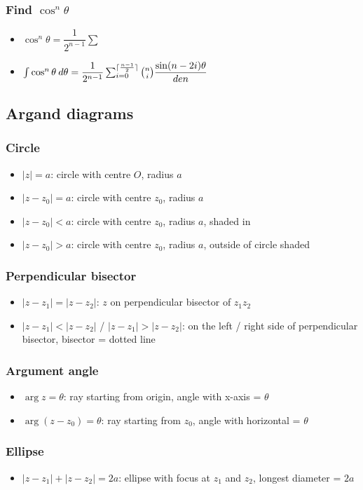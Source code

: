 \subsubsection{Find $\cos^n\theta$}
\begin{itemize}
	\item $\cos^n\theta = \dfrac{1}{2^{n-1}}\sum$
	\item $\int \cos^n\theta \: d\theta = \dfrac{1}{2^{n-1}} \sum_{i=0}^{\lceil\frac{n-1}{2}\rceil} \binom{n}{i} \dfrac{\sin (n-2i)\theta}{den}$
\end{itemize}


\subsection{Argand diagrams}
\subsubsection{Circle}
\begin{itemize}
	\item $|z| = a$: circle with centre $O$, radius $a$
	\item $|z-z_0|=a$: circle with centre $z_0$, radius $a$
	\item $|z-z_0|<a$: circle with centre $z_0$, radius $a$, shaded in
	\item $|z-z_0|>a$: circle with centre $z_0$, radius $a$, outside of circle shaded
\end{itemize}
\subsubsection{Perpendicular bisector}
\begin{itemize}
	\item $|z-z_1|=|z-z_2|$: $z$ on perpendicular bisector of $z_1z_2$
	\item $|z-z_1|<|z-z_2|$ / $|z-z_1|>|z-z_2|$: on the left / right side of perpendicular bisector, bisector = dotted line
\end{itemize}
\subsubsection{Argument angle}
\begin{itemize}
	\item $\arg z = \theta$: ray starting from origin, angle with x-axis = $\theta$
	\item $\arg (z-z_0) = \theta$: ray starting from $z_0$, angle with horizontal = $\theta$
\end{itemize}
\subsubsection{Ellipse}
\begin{itemize}
	\item $|z-z_1|+|z-z_2|=2a$: ellipse with focus at $z_1$ and $z_2$, longest diameter = $2a$
\end{itemize}



